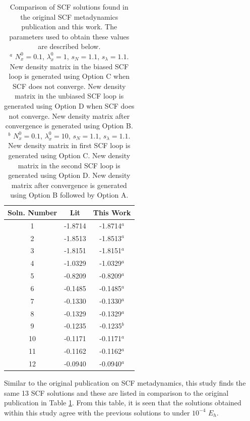 \documentclass[final,3p,times,twocolumn]{elsarticle}
\begin{document}
\begin{table}
\centering
\begin{tabular}{c|cc} \hline\hline
Soln. Number & Lit\cite{scfmd} & This Work \\ \hline
1 & -1.8714 & -1.8714$^a$ \\
2 & -1.8513 & -1.8513$^a$ \\
3 & -1.8151 & -1.8151$^a$ \\
4 & -1.0329 & -1.0329$^a$ \\
5 & -0.8209 & -0.8209$^a$ \\
6 & -0.1485 & -0.1485$^a$ \\
7 & -0.1330 & -0.1330$^a$ \\
8 & -0.1329 & -0.1329$^a$ \\
9 & -0.1235 & -0.1235$^b$ \\
10 & -0.1171 & -0.1171$^a$ \\
11 & -0.1162 & -0.1162$^a$ \\
12 & -0.0940 & -0.0940$^a$ \\ \hline\hline
\end{tabular}
\caption{Comparison of SCF solutions found in the original SCF metadynamics publication\cite{scfmd} and this work. The parameters used to obtain these values are described below.\\
$^a$ $N_x^0 = 0.1$, $\lambda_x^0 = 1$, $s_N = 1.1$, $s_\lambda = 1.1$. New density matrix in the biased SCF loop is generated using Option C when SCF does not converge. New density matrix in the unbiased SCF loop is generated using Option D when SCF does not converge. New density matrix after convergence is generated using Option B.\\
$^b$ $N_x^0 = 0.1$, $\lambda_x^0 = 10$, $s_N = 1.1$, $s_\lambda = 1.1$. New density matrix in first SCF loop is generated using Option C. New density matrix in the second SCF loop is generated using Option D. New density matrix after convergence is generated using Option B followed by Option A.}
\label{tab:h4results}
\end{table}

Similar to the original publication on SCF metadynamics,\cite{scfmd} this study finds the same 13 SCF solutions and these are listed in comparison to the original publication in Table \ref{tab:h4results}. From this table, it is seen that the solutions obtained within this study agree with the previous solutions to under $10^{-4}$ $E_h$. 
\end{document}
